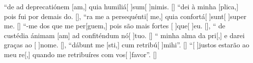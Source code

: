 {    %
    {``de ad deprecatiónem [am,] quia humiliá[ ]{sum}[ ]{ni}mis. [\LinkLA]}%
        {``dei à minha [plica,] pois fui por demais \-do. [\LinkPT]},
    {``ra me a persequénti[ me,] quia confortá[ ]{sunt}[ ]{su}per me. [\LinkLA]}%
        {``-me dos que me per[guem,] pois são mais fortes [ ]{que}[ ]{eu}. [\LinkPT]},
    {`` de custédia ánimam [am] ad confitén\-dum nó[ ]{tu}o. [\LinkLA]}%
        {`` minha alma da pri[,] e darei graças ao [ ]{no}me. [\LinkPT]},
    {``dábunt me [sti,] cum retribú[ ]{mi}hi''.
            [\LinkLA]}%
        {``[ ]{jus}tos estarão ao meu re[,] quando me retribuíres com vos[ ]{fa}{vor}''. [\LinkPT]}
}